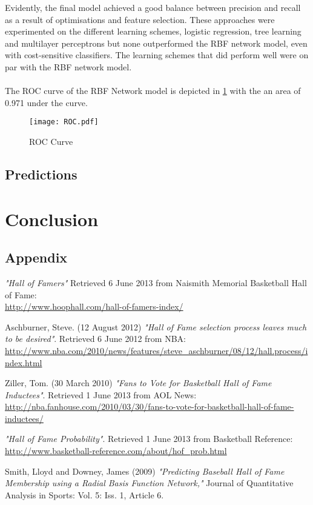 \documentclass[paper=a4, fontsize=11pt]{scrartcl} %
\numberwithin{equation}{section} %
\numberwithin{figure}{section} %
\numberwithin{table}{section} %
\begin{document}
Evidently, the final model achieved a good balance between precision and recall as a result of optimisations and feature selection. These approaches were experimented on the different learning schemes, logistic regression, tree learning and multilayer perceptrons but none outperformed the RBF network model, even with cost-sensitive classifiers. The learning schemes that did perform well were on par with the RBF network model.\\
\\
The ROC curve of the RBF Network model is depicted in \ref{rbf_roc} with the an area of 0.971 under the curve.
\begin{figure}[thb]
  \caption{\label{rbf_roc}ROC Curve}
  \centering
    \texttt{[image: ROC.pdf]}
\end{figure}

\subsection{Predictions}

\section{Conclusion}

\begin{appendix}
\section{Appendix}

\end{appendix}

\begin{thebibliography}{9}

	\emph{"Hall of Famers"}
	Retrieved 6 June 2013 from Naismith Memorial Basketball Hall of Fame:\\
	\url{http://www.hoophall.com/hall-of-famers-index/} 

Aschburner, Steve. (12 August 2012)
\emph{"Hall of Fame selection process leaves much to be desired"}.
Retrieved 6 June 2012 from NBA:
\url{http://www.nba.com/2010/news/features/steve_aschburner/08/12/hall.process/index.html}   

   Ziller, Tom. (30 March 2010)
  \emph{"Fans to Vote for Basketball Hall of Fame Inductees"}.
   Retrieved 1 June 2013 from AOL News:
   \url{http://nba.fanhouse.com/2010/03/30/fans-to-vote-for-basketball-hall-of-fame-inductees/}
   
  \emph{"Hall of Fame Probability"}.
   Retrieved 1 June 2013 from Basketball Reference:\\
   \url{http://www.basketball-reference.com/about/hof_prob.html}  
 
Smith, Lloyd and Downey, James (2009)
\emph{"Predicting Baseball Hall of Fame Membership using a Radial Basis Function Network,"}
Journal of Quantitative Analysis in Sports: Vol. 5: Iss. 1, Article 6.
 
\end{thebibliography}
\end{document}
